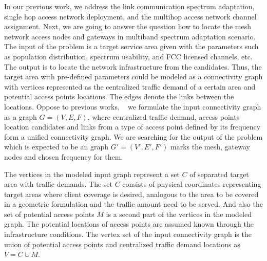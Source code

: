

In our previous work, we address the link communication spectrum adaptation, 
single hop access network deployment, and the multihop access network channel
assignment. Next, we are going to answer the question how to locate the mesh
network access nodes and gateways in multiband spectrum adaptation scenario.
The input of the problem is a target service area given with the parameters 
such as population distribution, spectrum usability, and FCC licensed channels, 
etc. The output is to locate the network infrastructure from the candidates.
Thus, the target area with pre-defined parameters could be modeled as a 
connectivity graph with vertices represented as the centralized traffic demand 
of a certain area and potential access points locations. The edges denote the 
links between the locations. Oppose to previous works,
~\cite{robinson2010deploying,franklin2007node,tang2005interference,irwin2013resource}
we formulate the input connectivity graph as a graph $G = (V,E,F)$, where centralized
traffic demand, access points location candidates and links from a type of access 
point defined by its frequency form a unified connectivity graph. 
We are searching for the output of the problem which is expected to be an graph 
$G' = (V',E',F')$ marks the mesh, gateway nodes and chosen frequency for them. 

The vertices in the modeled input graph represent a set $C$ of  separated target 
area with traffic demands. The set $C$ consists of physical coordinates representing 
target areas where client coverage is desired, analogous to the area to be covered 
in a geometric formulation and the traffic amount need to be served. And also the 
set of potential access points $M$ is a second part of the vertices in the modeled 
graph. The potential locations of access points are assumed known through the 
infrastructure conditions. The vertex set of the input connectivity graph is 
the union of potential access points and centralized traffic demand locations as 
$V = C\cup M$.


